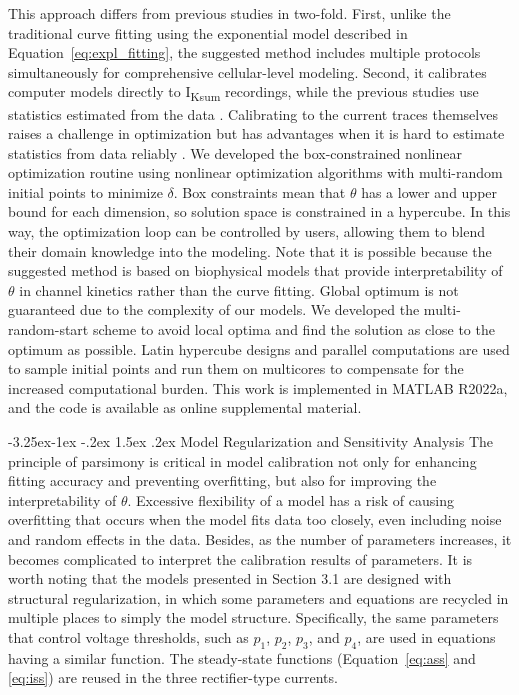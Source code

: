 \documentclass[11pt]{article}
\makeatletter
\renewcommand\subsection{\@startsection{subsection}{2}{\z@}%
                                     {-3.25ex\@plus -1ex \@minus -.2ex}%
                                     {1.5ex \@plus .2ex}%
                                     {\normalfont\fontfamily{phv}\fontsize{14}{17}\bfseries}}
\makeatother
\begin{document}
This approach differs from previous studies in two-fold. First, unlike the traditional curve fitting using the exponential model described in Equation~\ref{eq:expl_fitting}, the suggested method includes multiple protocols simultaneously for comprehensive cellular-level modeling. Second, it calibrates computer models directly to I\textsubscript{Ksum} recordings, while the previous studies use statistics estimated from the data \citep{du2015statistical, du2017silico, kim2022simulation}. Calibrating to the current traces themselves raises a challenge in optimization but has advantages when it is hard to estimate statistics from data reliably \citep{kim2022simulation}. We developed the box-constrained nonlinear optimization routine using nonlinear optimization algorithms with multi-random initial points to minimize $\delta$. Box constraints mean that $\theta$ has a lower and upper bound for each dimension, so solution space is constrained in a hypercube. In this way, the optimization loop can be controlled by users, allowing them to blend their domain knowledge into the modeling. Note that it is possible because the suggested method is based on biophysical models that provide interpretability of $\theta$ in channel kinetics rather than the curve fitting. Global optimum is not guaranteed due to the complexity of our models. We developed the multi-random-start scheme to avoid local optima and find the solution as close to the optimum as possible. Latin hypercube designs and parallel computations are used to sample initial points and run them on multicores to compensate for the increased computational burden. This work is implemented in MATLAB R2022a, and the code is available as online supplemental material.

\subsection{Model Regularization and Sensitivity Analysis}
The principle of parsimony is critical in model calibration not only for enhancing fitting accuracy and preventing overfitting, but also for improving the interpretability of $\theta$. Excessive flexibility of a model has a risk of causing overfitting that occurs when the model fits data too closely, even including noise and random effects in the data. Besides, as the number of parameters increases, it becomes complicated to interpret the calibration results of parameters. It is worth noting that the models presented in Section 3.1 are designed with structural regularization, in which some parameters and equations are recycled in multiple places to simply the model structure. Specifically, the same parameters that control voltage thresholds, such as $p_{1}$, $p_{2}$, $p_{3}$, and $p_{4}$, are used in equations having a similar function. The steady-state functions (Equation~\ref{eq:ass} and \ref{eq:iss}) are reused in the three rectifier-type currents. 
\end{document}
